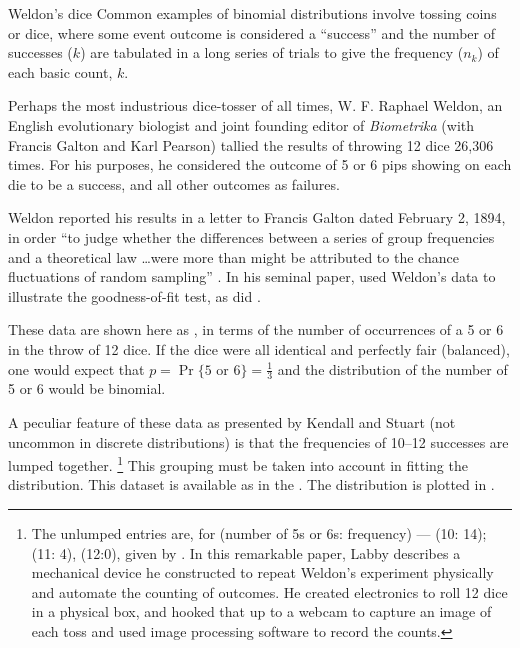 \documentclass[10pt,krantz2]{krantz}\usepackage[]{graphicx}\usepackage[]{color}
\begin{document}
\begin{Example}[dice]{Weldon's dice}
Common examples of binomial distributions involve tossing coins
or dice, where some event outcome is considered a ``success''
and the number of successes ($k$) are tabulated
in a long series of trials to give the frequency ($n_k$)
of each basic count, $k$.

Perhaps the most industrious dice-tosser of all times,
W. F. Raphael Weldon, an English evolutionary biologist
and joint founding editor of \emph{Biometrika} (with Francis Galton and Karl Pearson)
tallied the results of throwing 12 dice 26,306 times.
For his purposes, he considered the outcome of 5 or 6 pips showing on each die
to be a success, and all other outcomes as failures.

Weldon reported his results in a letter to Francis Galton dated
February 2, 1894, in order
``to judge whether the differences between a series of group frequencies
and a theoretical law \dots were more than might be attributed
to the chance fluctuations of random sampling''
\citep{KempKemp:91}.
In his seminal paper,
\citet{Pearson:00} used Weldon's data to illustrate the \chisq{} goodness-of-fit test, as did
\citet[Table 5.1, p. 121]{KendallStuart:63}.

These data are
shown here as
,
in terms of the number of occurrences of a 5 or
6 in the throw of 12 dice.
If the dice were all identical and perfectly fair (balanced), one would
expect that $p = \Pr\{5 \textrm{ or } 6\} = \frac13$
and the distribution of the number of 5 or 6 would be binomial.

A peculiar feature of these data
as presented by Kendall and Stuart (not uncommon in discrete distributions)
is that the frequencies of 10--12 successes
are lumped together.%
\footnote{
The unlumped entries are, for (number of 5s or 6s: frequency) ---
(10: 14); (11: 4), (12:0),
given by \citet{Labby:2009}.
In this remarkable paper, Labby describes a mechanical device he constructed to
repeat Weldon's experiment physically and automate the counting of outcomes.
He created electronics to roll 12 dice in a physical box, and hooked that
up to a webcam to capture an image of each toss and used image processing
software to record the counts.
}
This grouping must be taken into account in fitting
the distribution.  This dataset is available as  in the
.  The distribution is plotted in .





\end{Example}
\end{document}
